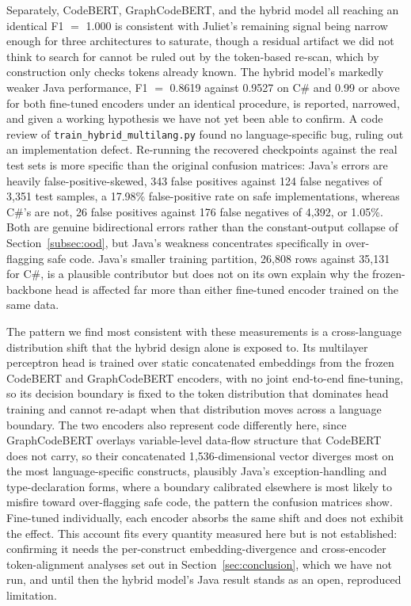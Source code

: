 \documentclass{ieeeaccess}
\begin{document}
Separately, CodeBERT, GraphCodeBERT, and the hybrid model all reaching an identical F1 $=$ 1.000 is consistent with Juliet's remaining signal being narrow enough for three architectures to saturate, though a residual artifact we did not think to search for cannot be ruled out by the token-based re-scan, which by construction only checks tokens already known. The hybrid model's markedly weaker Java performance, F1 $=$ 0.8619 against 0.9527 on C\# and 0.99 or above for both fine-tuned encoders under an identical procedure, is reported, narrowed, and given a working hypothesis we have not yet been able to confirm. A code review of \texttt{train\_hybrid\_multilang.py} found no language-specific bug, ruling out an implementation defect. Re-running the recovered checkpoints against the real test sets is more specific than the original confusion matrices: Java's errors are heavily false-positive-skewed, 343 false positives against 124 false negatives of 3{,}351 test samples, a 17.98\% false-positive rate on safe implementations, whereas C\#'s are not, 26 false positives against 176 false negatives of 4{,}392, or 1.05\%. Both are genuine bidirectional errors rather than the constant-output collapse of Section~\ref{subsec:ood}, but Java's weakness concentrates specifically in over-flagging safe code. Java's smaller training partition, 26{,}808 rows against 35{,}131 for C\#, is a plausible contributor but does not on its own explain why the frozen-backbone head is affected far more than either fine-tuned encoder trained on the same data.

The pattern we find most consistent with these measurements is a cross-language distribution shift that the hybrid design alone is exposed to. Its multilayer perceptron head is trained over static concatenated embeddings from the frozen CodeBERT and GraphCodeBERT encoders, with no joint end-to-end fine-tuning, so its decision boundary is fixed to the token distribution that dominates head training and cannot re-adapt when that distribution moves across a language boundary. The two encoders also represent code differently here, since GraphCodeBERT overlays variable-level data-flow structure that CodeBERT does not carry, so their concatenated 1{,}536-dimensional vector diverges most on the most language-specific constructs, plausibly Java's exception-handling and type-declaration forms, where a boundary calibrated elsewhere is most likely to misfire toward over-flagging safe code, the pattern the confusion matrices show. Fine-tuned individually, each encoder absorbs the same shift and does not exhibit the effect. This account fits every quantity measured here but is not established: confirming it needs the per-construct embedding-divergence and cross-encoder token-alignment analyses set out in Section~\ref{sec:conclusion}, which we have not run, and until then the hybrid model's Java result stands as an open, reproduced limitation.
\end{document}

